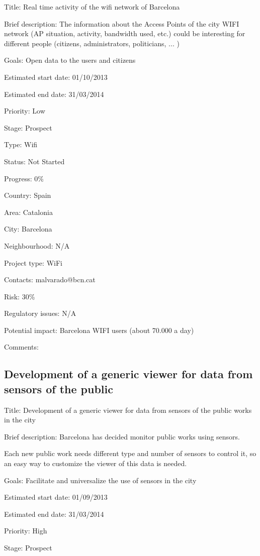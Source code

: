 \documentclass[draftclsnofoot,12pt,journal,onecolumn]{IEEEtran}
\begin{document}
Title: Real time activity of the wifi network of Barcelona 

Brief description: The information about the Access Points of the city WIFI 
network (AP situation, activity, bandwidth used, etc.) could be interesting 
for different people (citizens, administrators, politicians, ... )

Goals: Open data to the users and citizens 

Estimated start date: 01/10/2013 

Estimated end date: 31/03/2014 

Priority: Low 

Stage: Prospect 

Type: Wifi 

Status: Not Started 

Progress: 0\% 

Country: Spain 

Area: Catalonia 

City: Barcelona 

Neighbourhood: N/A 

Project type: WiFi 

Contacts: malvarado@bcn.cat

Risk: 30\% 

Regulatory issues: N/A 

Potential impact: Barcelona WIFI users (about 70.000 a day) 

Comments: 

\subsection{Development of a generic viewer for data from sensors of the public} 

Title: Development of a generic viewer for data from sensors of the public 
works in the city 

Brief description: Barcelona has decided monitor public works using sensors. 

Each new public work needs different type and number of sensors to control 
it, so an easy way to customize the viewer of this data is needed. 

Goals: Facilitate and universalize the use of sensors in the city 

Estimated start date: 01/09/2013 

Estimated end date: 31/03/2014 

Priority: High 

Stage: Prospect 
\end{document}
